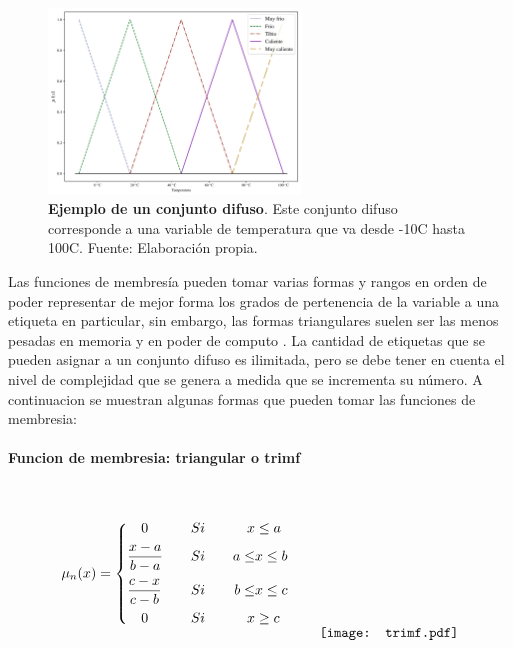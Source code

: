             \begin{figure}[htb]
                \centering
                \includegraphics[width=0.6\textwidth]{FuzzySet.pdf}
                \caption[Ejemplo de un conjunto difuso]{\textbf{Ejemplo de un conjunto difuso}. Este conjunto difuso corresponde a una variable de temperatura que va desde -10\textdegree C hasta 100\textdegree C. Fuente: Elaboración propia.} 
                \label{fig:FuzzySet}
            \end{figure}
            
            Las funciones de membresía pueden tomar varias formas y rangos en orden de poder representar de mejor forma los grados de pertenencia de la variable a una etiqueta en particular, sin embargo, las formas triangulares suelen ser las menos pesadas en memoria y en poder de computo \Parencite{riid2003transparent}. La cantidad de etiquetas que se pueden asignar a un conjunto difuso es ilimitada, pero se debe tener en cuenta el nivel de complejidad que se genera a medida que se incrementa su número. A continuacion se muestran algunas formas que pueden tomar las funciones de membresia:

            \paragraph{Funcion de membresia: triangular o trimf}$\quad$
            
            \begin{equation*}\label{eq:trimf}
                \mu_n(x) = \left\{
                    \begin{aligned}
                        &\quad 0  &\quad &Si \quad & x &\leq a\\
                        &\frac{x - a}{b - a}  &\quad &Si \quad &  a \le &x \leq b \\
                        &\frac{c - x}{c - b}  &\quad &Si \quad & b \le &x \leq c \\
                        &\quad 0  &\quad &Si \quad&  x &\geq c
                    \end{aligned}\right.
                    \qquad
                    \raisebox{-15mm}{\texttt{[image: trimf.pdf]}}
            \end{equation*}
            
